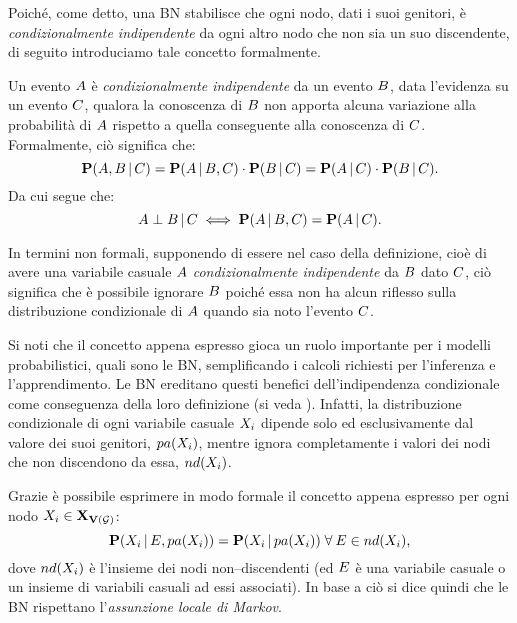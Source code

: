 Poiché, come detto, una \acl{BN} stabilisce che ogni nodo, dati i suoi genitori, è \emph{condizionalmente indipendente} da ogni altro nodo che non sia un suo discendente, di seguito introduciamo tale concetto formalmente.
\begin{definizione}\label{defn:ic}
Un evento $\mathnormal{A}$ è \emph{condizionalmente indipendente} da un evento $\mathnormal{B}$, data l'evidenza su un evento $\mathnormal{C}$, qualora la conoscenza di $\mathnormal{B}$ non apporta alcuna variazione alla probabilità di $\mathnormal{A}$ rispetto a quella conseguente alla conoscenza di $\mathnormal{C}$.
Formalmente, ciò significa che:
\[
\mathbf{P}(\mathnormal{A},\mathnormal{B}\,\arrowvert\,\mathnormal{C})=\mathbf{P}(\mathnormal{A}\,\arrowvert\,\mathnormal{B},\mathnormal{C})\cdot\mathbf{P}(\mathnormal{B}\,\arrowvert\,\mathnormal{C})=\mathbf{P}(\mathnormal{A}\,\arrowvert\,\mathnormal{C})\cdot\mathbf{P}(\mathnormal{B}\,\arrowvert\,\mathnormal{C})\text{.}
\]
Da cui segue che:
\[
\mathnormal{A}\perp\mathnormal{B}\,\arrowvert\,\mathnormal{C}\iff\mathbf{P}(\mathnormal{A}\,\arrowvert\,\mathnormal{B},\mathnormal{C})=\mathbf{P}(\mathnormal{A}\,\arrowvert\,\mathnormal{C})\text{.}
\]
\end{definizione}
In termini non formali, supponendo di essere nel caso della definizione, cioè di avere una variabile casuale $\mathnormal{A}$ \emph{condizionalmente indipendente} da $\mathnormal{B}$ dato $\mathnormal{C}$, ciò significa che è possibile ignorare $\mathnormal{B}$ poiché essa non ha alcun riflesso sulla distribuzione condizionale di $\mathnormal{A}$ quando sia noto l'evento $\mathnormal{C}$.

Si noti che il concetto appena espresso gioca un ruolo importante per i modelli probabilistici, quali sono le \acl{BN}, semplificando i calcoli richiesti per l'inferenza e l'apprendimento. Le \acl{BN} ereditano questi benefici dell'indipendenza condizionale come conseguenza della loro definizione (si veda ). Infatti, la distribuzione condizionale di ogni variabile casuale $\mathnormal{X_i}$ dipende solo ed esclusivamente dal valore dei suoi genitori, $pa(\mathnormal{X_i})$, mentre ignora completamente i valori dei nodi che non discendono da essa, $nd(\mathnormal{X_i})$.

Grazie  è possibile esprimere in modo formale il concetto appena espresso per ogni nodo $\mathnormal{X_i}\in\mathbf{X}_{\mathbf{V}(\mathcal{G})}$:
\[
\mathbf{P}(\mathnormal{X_i}\,\arrowvert\,\mathnormal{E},pa(\mathnormal{X_i}))=\mathbf{P}(\mathnormal{X_i}\,\arrowvert\,pa(\mathnormal{X_i}))\;\forall\:\mathnormal{E}\in nd(\mathnormal{X_i})\text{,}
\]
dove $nd(\mathnormal{X_i})$ è l'insieme dei nodi non--discendenti (ed $\mathnormal{E}$ è una variabile casuale o un insieme di variabili casuali ad essi associati).
In base a ciò si dice quindi che le \acl{BN} rispettano l'\emph{assunzione locale di Markov}.

